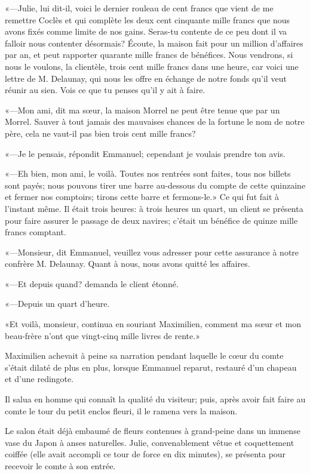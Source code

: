 «—Julie, lui dit-il, voici le dernier rouleau de cent francs que vient de me remettre Coclès et qui complète les deux cent cinquante mille francs que nous avons fixés comme limite de nos gains. Seras-tu contente de ce peu dont il va falloir nous contenter désormais? Écoute, la maison fait pour un million d'affaires par an, et peut rapporter quarante mille francs de bénéfices. Nous vendrons, si nous le voulons, la clientèle, trois cent mille francs dans une heure, car voici une lettre de M. Delaunay, qui nous les offre en échange de notre fonds qu'il veut réunir au sien. Vois ce que tu penses qu'il y ait à faire. 

«—Mon ami, dit ma sœur, la maison Morrel ne peut être tenue que par un Morrel. Sauver à tout jamais des mauvaises chances de la fortune le nom de notre père, cela ne vaut-il pas bien trois cent mille francs? 

«—Je le pensais, répondit Emmanuel; cependant je voulais prendre ton avis. 

«—Eh bien, mon ami, le voilà. Toutes nos rentrées sont faites, tous nos billets sont payés; nous pouvons tirer une barre au-dessous du compte de cette quinzaine et fermer nos comptoirs; tirons cette barre et fermons-le.» Ce qui fut fait à l'instant même. Il était trois heures: à trois heures un quart, un client se présenta pour faire assurer le passage de deux navires; c'était un bénéfice de quinze mille francs comptant. 

«—Monsieur, dit Emmanuel, veuillez vous adresser pour cette assurance à notre confrère M. Delaunay. Quant à nous, nous avons quitté les affaires. 

«—Et depuis quand? demanda le client étonné. 

«—Depuis un quart d'heure. 

«Et voilà, monsieur, continua en souriant Maximilien, comment ma sœur et mon beau-frère n'ont que vingt-cinq mille livres de rente.»  

Maximilien achevait à peine sa narration pendant laquelle le cœur du comte s'était dilaté de plus en plus, lorsque Emmanuel reparut, restauré d'un chapeau et d'une redingote. 

Il salua en homme qui connaît la qualité du visiteur; puis, après avoir fait faire au comte le tour du petit enclos fleuri, il le ramena vers la maison. 

Le salon était déjà embaumé de fleurs contenues à grand-peine dans un immense vase du Japon à anses naturelles. Julie, convenablement vêtue et coquettement coiffée (elle avait accompli ce tour de force en dix minutes), se présenta pour recevoir le comte à son entrée.  

